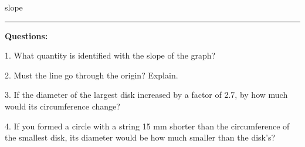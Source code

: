 \vspace{10pt}

slope \rule{1.5in}{0.2pt}

\vspace{10pt}

\textbf{Questions:}

1. What quantity is identified with the slope of the graph? 
\vspace{10mm}

2. Must the line go through the origin? Explain. 
\vspace{20mm}

3. If the diameter of the largest disk increased by a factor of 2.7, by how much
would its circumference change? 
\vspace{20mm}

4. If you formed a circle with a string 15 mm shorter than the circumference
of the smallest disk, its diameter would be how much smaller than the disk's?

